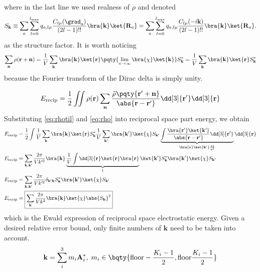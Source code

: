 \documentclass[12pt]{extarticle}
\renewcommand{\bf}{\mathbf}
\begin{document}
    where in the last line we used realness of \(\rho\) and denoted \begin{equation}
        S_{\bf k} \equiv \sum_{a} \sum_{l = 0}^{l_{\max}} q_{a, l \mu} \frac{C_{l \mu} (\grad_a)}{(2l - 1)!!} \bra{\bf k} \ket{\bf R_a} = \sum_{a} \sum_{l = 0}^{l_{\max}} q_{a, l \mu} \frac{C_{l \mu} (-i \bf k )}{(2l - 1)!!} \bra{\bf k} \ket{\bf R_a}. \label{eq:esf}
    \end{equation}
    as the structure factor. It is worth noticing \begin{equation}
        \sum_{\bf n} \rho( \bf r + \bf n) = \frac{1}{V}\sum_{\bf k} \bra{\bf k} \ket{\bf r}\pqty{ \lim_{\kappa \to \infty} \bra{\chi }\ket{\bf k}}  S_{\bf k}^* = \frac{1}{V}\sum_{\bf k} \bra{\bf k} \ket{\bf r} S_{\bf k}^* \label{eq:rho}
    \end{equation}
    because the Fourier transform of the Dirac delta is simply unity.

    \[
        E_\text{recip} = \frac{1}{2} \iint \rho(\bf r) \sum_{\bf n} \frac{\tilde{\rho} \pqty{ \bf r' + \bf n}}{\abs{\bf r - \bf r'}} \dd[3]{\bf r'} \dd[3]{\bf r} 
    \]
    Substituting \cref{eq:rhotil} and \cref{eq:rho} into reciprocal space part energy, we obtain \begin{align*}
        E_\text{recip}&= \frac{1}{2} \int \frac{1}{V}\sum_{\bf k} \bra{\bf k} \ket{\bf r} S_{\bf k}^* \frac{1}{V}\sum_{\bf k'}   \bra{\bf k'}  \ket{\chi }  S_{\bf k'} \underbrace{\int \frac{\bra{\bf r'} \ket{\bf k'}}{\abs{\bf r - \bf r'}} \dd[3]{\bf r'} }_{\bra{\bf r} \ket{\bf k'} \frac{4 \pi}{k^2}} \dd[3]{\bf r} \\
        E_\text{recip}&= \sum_{\bf k, \bf k'} \frac{2\pi}{Vk'^2}   \bra{\bf k} \underbrace{\frac{1}{V} \int  \dd[3]{\bf r}\ket{\bf r} \bra{\bf r}}_1 \ket{\bf k'} S_{\bf k}^*   \bra{\bf k'}  \ket{\chi }  S_{\bf k'}\\
        E_\text{recip}&= \sum_{\bf k, \bf k'} \frac{2\pi}{Vk'^2}   \delta_{\bf k' \bf k} S_{\bf k}^*   \bra{\bf k'}  \ket{\chi }  S_{\bf k'}\\
        E_\text{recip}&= \boxed{\sum_{ \bf k} \frac{2\pi}{Vk^2}  \bra{\bf k}  \ket{\chi } \abs{ S_{\bf k}}^2}
    \end{align*}
    which is the Ewald expression of reciprocal space electrostatic energy. Given a desired relative error bound, only finite numbers of \(\bf k\) need to be taken into account. \[
        \bf k = \sum_i^3 m_i \bf A^*_i,\; m_i \in \bqty{\text{floor} - \frac{K_i - 1}{2}, \text{floor} \frac{K_i - 1}{2}  }
    \]
\end{document}
